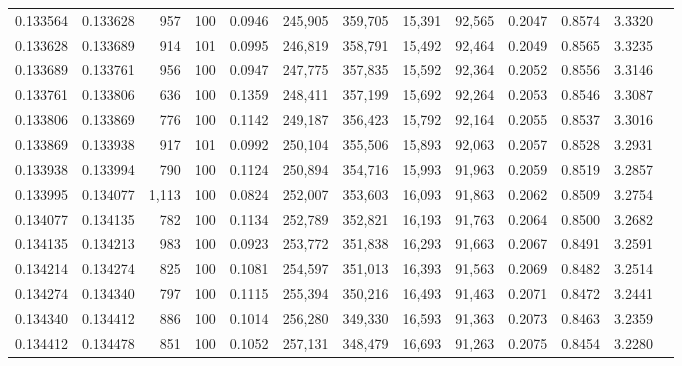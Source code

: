 \begin{tabular}{rrrrrrrrrrrrr}
0.133564 & 0.133628 &   957 & 100 &                                     0.0946 & 245,905 & 359,705 &  15,391 &  92,565 & 0.2047 & 0.8574 & 3.3320 \\
0.133628 & 0.133689 &   914 & 101 &                                     0.0995 & 246,819 & 358,791 &  15,492 &  92,464 & 0.2049 & 0.8565 & 3.3235 \\
0.133689 & 0.133761 &   956 & 100 &                                     0.0947 & 247,775 & 357,835 &  15,592 &  92,364 & 0.2052 & 0.8556 & 3.3146 \\
0.133761 & 0.133806 &   636 & 100 &                                     0.1359 & 248,411 & 357,199 &  15,692 &  92,264 & 0.2053 & 0.8546 & 3.3087 \\
0.133806 & 0.133869 &   776 & 100 &                                     0.1142 & 249,187 & 356,423 &  15,792 &  92,164 & 0.2055 & 0.8537 & 3.3016 \\
0.133869 & 0.133938 &   917 & 101 &                                     0.0992 & 250,104 & 355,506 &  15,893 &  92,063 & 0.2057 & 0.8528 & 3.2931 \\
0.133938 & 0.133994 &   790 & 100 &                                     0.1124 & 250,894 & 354,716 &  15,993 &  91,963 & 0.2059 & 0.8519 & 3.2857 \\
0.133995 & 0.134077 & 1,113 & 100 &                                     0.0824 & 252,007 & 353,603 &  16,093 &  91,863 & 0.2062 & 0.8509 & 3.2754 \\
0.134077 & 0.134135 &   782 & 100 &                                     0.1134 & 252,789 & 352,821 &  16,193 &  91,763 & 0.2064 & 0.8500 & 3.2682 \\
0.134135 & 0.134213 &   983 & 100 &                                     0.0923 & 253,772 & 351,838 &  16,293 &  91,663 & 0.2067 & 0.8491 & 3.2591 \\
0.134214 & 0.134274 &   825 & 100 &                                     0.1081 & 254,597 & 351,013 &  16,393 &  91,563 & 0.2069 & 0.8482 & 3.2514 \\
0.134274 & 0.134340 &   797 & 100 &                                     0.1115 & 255,394 & 350,216 &  16,493 &  91,463 & 0.2071 & 0.8472 & 3.2441 \\
0.134340 & 0.134412 &   886 & 100 &                                     0.1014 & 256,280 & 349,330 &  16,593 &  91,363 & 0.2073 & 0.8463 & 3.2359 \\
0.134412 & 0.134478 &   851 & 100 &                                     0.1052 & 257,131 & 348,479 &  16,693 &  91,263 & 0.2075 & 0.8454 & 3.2280 \\

\end{tabular}
